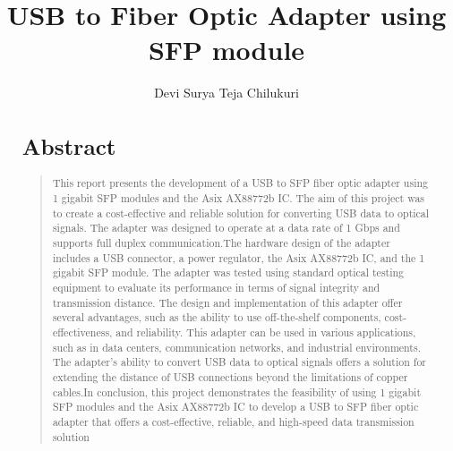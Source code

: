 \documentclass[fontsize=12pt,
parskip=half,	%
department=FakM,  %
twoside, %
DIV=15,BCOR=10mm, %
svgnames,table,hyperref, %
bookmarks, raiselinks, pageanchor, hyperindex, colorlinks, hidelinks, %
]{OTHRreprt}
\title{USB to Fiber Optic Adapter using SFP module}
\author{Devi Surya Teja Chilukuri}
\begin{document}
	\maketitle
	\cleardoublepage
	\begin{abstract}
	\section*{Abstract}
	\begin{quote}
	This report presents the development of a USB to SFP fiber optic adapter using 1 gigabit SFP modules and the Asix AX88772b IC. The aim of this project was to create a cost-effective and reliable solution for converting USB data to optical signals. The adapter was designed to operate at a data rate of 1 Gbps and supports full duplex communication.The hardware design of the adapter includes a USB connector, a power regulator, the Asix AX88772b IC, and the 1 gigabit SFP module. The adapter was tested using standard optical testing equipment to evaluate its performance in terms of signal integrity and transmission distance. The design and implementation of this adapter offer several advantages, such as the ability to use off-the-shelf components, cost-effectiveness, and reliability. This adapter can be used in various applications, such as in data centers, communication networks, and industrial environments. The adapter's ability to convert USB data to optical signals offers a solution for extending the distance of USB connections beyond the limitations of copper cables.In conclusion, this project demonstrates the feasibility of using 1 gigabit SFP modules and the Asix AX88772b IC to develop a USB to SFP fiber optic adapter that offers a cost-effective, reliable, and high-speed data transmission solution
	\end{quote}
	\end{abstract}
	\cleardoublepage
	{
		\hypersetup{linkcolor=black}	%
		\tableofcontents
	}
	
	\cleardoublepage		


		
	
\end{document}
